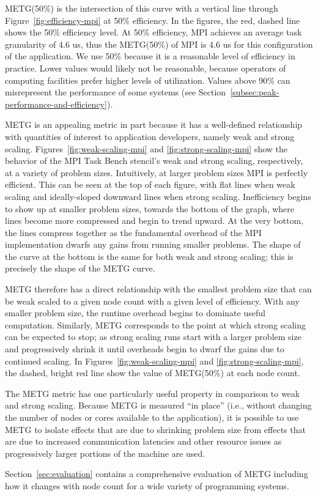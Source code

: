 METG(50\%) is the intersection of this curve with a vertical line through
Figure~\ref{fig:efficiency-mpi} at 50\% efficiency. In the figures, the red, dashed line shows the 50\% efficiency
level. At 50\% efficiency, MPI achieves an average task granularity of
4.6 us, thus the METG(50\%) of MPI is 4.6 us for this configuration of
the application. We use 50\% because it is a reasonable level of
efficiency in practice. Lower values would likely not be reasonable,
because operators of computing facilities prefer higher levels of
utilization. Values above 90\% can misrepresent the performance of
some systems (see
Section~\ref{subsec:peak-performance-and-efficiency}).

METG is an appealing metric in part because it has a well-defined
relationship with quantities of interest to application developers,
namely weak and strong scaling. Figures~\ref{fig:weak-scaling-mpi} and
\ref{fig:strong-scaling-mpi} show the behavior of the MPI Task Bench stencil's weak and strong
scaling, respectively, at a variety of problem sizes. Intuitively, at
larger problem sizes MPI is perfectly efficient. This can be seen at
the top of each figure, with flat lines when weak scaling and
ideally-sloped downward lines when strong scaling. Inefficiency begins
to show up at smaller problem sizes, towards the bottom of the graph,
where lines become more compressed and begin to trend upward. At the
very bottom, the lines compress together as the fundamental
overhead of the MPI implementation dwarfs any gains from running smaller
problems. The shape of the curve at the bottom is the same
for both weak and strong scaling; this is precisely the shape of
the METG curve.




METG therefore has a direct relationship with the smallest problem
size that can be weak scaled to a given node count with a given level
of efficiency. With any smaller problem size, 
the runtime overhead begins to dominate useful
computation. Similarly, METG corresponds to the point at which strong
scaling can be expected to stop; as strong scaling runs start with a
larger problem size and progressively shrink it until overheads begin
to dwarf the gains due to continued scaling. In
Figures~\ref{fig:weak-scaling-mpi} and \ref{fig:strong-scaling-mpi},
the dashed, bright red line show the value of METG(50\%) at each node
count.

The METG metric has one particularly useful property in comparison to
weak and strong scaling. Because METG is measured ``in place'' (i.e.,
without changing the number of nodes or cores available to the
application), it is possible to use METG to isolate effects that are
due to shrinking problem size from effects that are due to
increased communication latencies and other resource issues as
progressively larger portions of the machine are used.

Section~\ref{sec:evaluation} contains a comprehensive evaluation of
METG including how it changes with node count for a wide variety of
programming systems.
